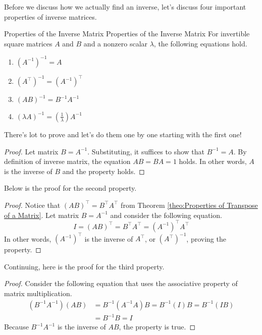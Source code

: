 \documentclass[../main.tex]{subfiles}
\begin{document}
Before we discuss how we actually find an inverse, let's discuss
four important properties of inverse matrices.

\begin{theorem}{Properties of the Inverse Matrix}
{Properties of the Inverse Matrix}
For invertible square matrices $A$ and $B$ and a nonzero scalar
$\lambda$, the following equations hold.
\begin{enumerate}
\item $(A^{-1})^{-1} = A$
\item $(A^\intercal)^{-1} = (A^{-1})^\intercal$
\item $(AB)^{-1} = B^{-1}A^{-1}$
\item $(\lambda A)^{-1} = (\frac{1}{\lambda})A^{-1}$
\end{enumerate}
\end{theorem}

There's lot to prove and let's do them one by one starting with
the first one!

\begin{proof}
Let matrix $B = A^{-1}$. Substituting, it suffices to show that
$B^{-1} = A$. By definition of inverse matrix, the equation
$AB = BA = 1$ holds. In other words, $A$ is the inverse of $B$
and the property holds.
\end{proof}

Below is the proof for the second property.

\begin{proof}
Notice that $(AB)^\intercal = B^\intercal A^\intercal$ from
Theorem \ref{theo:Properties of Transpose of a Matrix}. Let matrix
$B = A^{-1}$ and consider the following equation.
\[
I
= (AB)^\intercal
= B^\intercal A^\intercal
= \left( A^{-1} \right)^\intercal A^\intercal
\]
In other words, $(A^{-1})^\intercal$ is the inverse of $A^\intercal$,
or $(A^\intercal)^{-1}$, proving the property.
\end{proof}

Continuing, here is the proof for the third property.

\begin{proof}
Consider the following equation that uses the associative property
of matrix multiplication.
\begin{align*}
    (B^{-1}A^{-1})(AB)
    &= B^{-1}(A^{-1}A)B
    = B^{-1}(I)B
    = B^{-1}(IB) \\
    &= B^{-1}B
    = I
\end{align*}
Because $B^{-1}A^{-1}$ is the inverse of $AB$, the property is true.
\end{proof}
\end{document}
